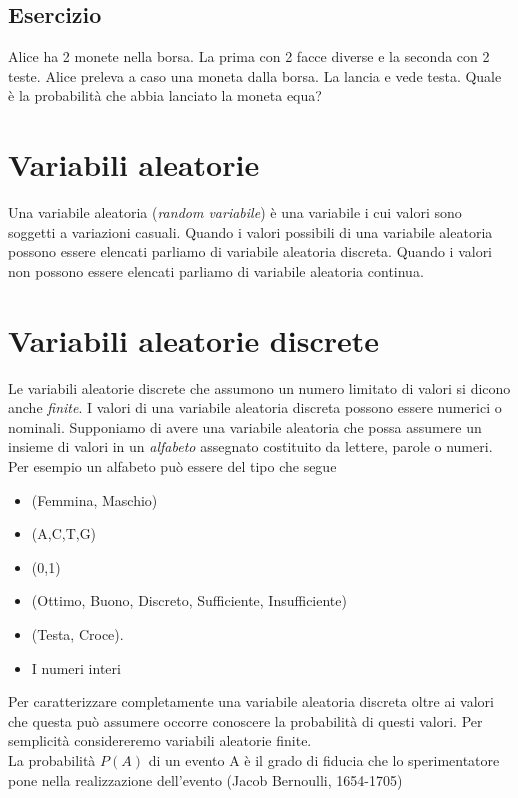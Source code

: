 \documentclass[onecolumn,12pt]{book}\usepackage[]{graphicx}\usepackage[]{color}
\begin{document}
\subsection{Esercizio} 

Alice ha 2 monete nella borsa. La prima con 2 facce diverse e la seconda con 2 teste. Alice preleva a caso una moneta dalla borsa. La lancia e vede testa. Quale è la probabilità che abbia lanciato la moneta equa?


\section{Variabili aleatorie}
Una variabile aleatoria (\emph{random variabile}) \`e
 una variabile i cui valori sono soggetti a variazioni casuali. Quando i valori possibili di una variabile aleatoria  possono essere elencati parliamo di variabile aleatoria discreta. Quando i valori non possono essere elencati parliamo di variabile aleatoria continua.

\section{Variabili aleatorie discrete}
Le variabili aleatorie  discrete che  assumono un numero limitato di valori si dicono anche \emph{finite}.  I valori di una variabile aleatoria discreta possono essere numerici o nominali.
 Supponiamo di avere una variabile aleatoria che possa assumere un insieme di valori in  un \emph{alfabeto} assegnato costituito da lettere, parole o numeri. Per esempio un alfabeto pu\`o essere del tipo che segue
\begin{itemize}
\item{}(Femmina, Maschio)
\item{}(A,C,T,G)
\item{} (0,1)
\item{}(Ottimo, Buono, Discreto, Sufficiente, Insufficiente)
\item{} (Testa, Croce).
\item{} I numeri interi
\end{itemize}
Per caratterizzare completamente una variabile aleatoria discreta oltre ai valori che questa pu\`o  assumere occorre conoscere la probabilit\`a  di questi valori.
Per semplicit\`a considereremo variabili aleatorie finite.\\

 

La probabilità $P(A)$ di un evento A è il grado di fiducia  che lo sperimentatore pone nella realizzazione dell'evento (Jacob Bernoulli, 1654-1705) 
\end{document}
